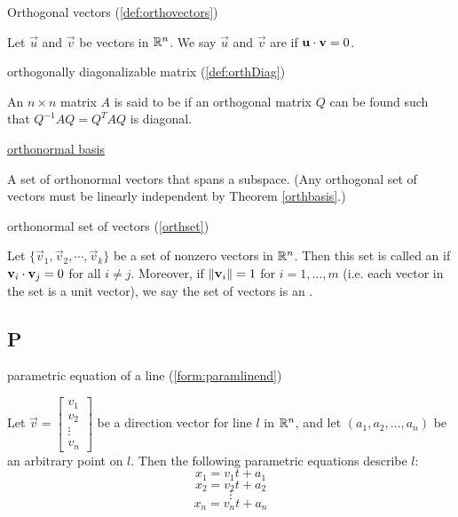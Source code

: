 \documentclass{ximera}
\begin{document}
Orthogonal vectors (\ref{def:orthovectors}) 
\begin{expandable}{}{}
Let $\vec{u}$ and $\vec{v}$ be vectors in $\mathbb{R}^n$. We say $\vec{u}$ and $\vec{v}$ are  if $\mathbf{u}\cdot \mathbf{v}=0$.
\end{expandable}


orthogonally diagonalizable matrix (\ref{def:orthDiag})
\begin{expandable}{}{}
    An $n \times n$ matrix $A$ is said to be  if an orthogonal matrix $Q$ can be found such that  $Q^{-1}AQ = Q^{T}AQ$ is diagonal.
\end{expandable}

\href{https://ximera.osu.edu/linearalgebradzv3/LinearAlgebraInteractiveIntro/RTH-0010/main}{orthonormal basis}
\begin{expandable}{}{}
    A set of orthonormal vectors that spans a subspace. (Any orthogonal set of vectors must be linearly independent by Theorem \ref{orthbasis}.)
\end{expandable}

orthonormal set of vectors (\ref{orthset})
\begin{expandable}{}{}
    Let $\{ \vec{v}_1, \vec{v}_2, \cdots, \vec{v}_k \}$ be a set of nonzero
vectors in $\mathbb{R}^n$. Then this set is called an
 if 
$\mathbf{v}_i \cdot \mathbf{v}_j = 0$ for all $i \neq j$.
Moreover, if $\left\lVert\mathbf{v}_i\right\rVert=1$ for $i=1,\ldots,m$ (i.e. each vector in the set is a unit vector), we say the set of vectors is an .
\end{expandable}



\subsection*{P}

parametric equation of a line (\ref{form:paramlinend})
\begin{expandable}{}{}
    Let $\vec{v}=\begin{bmatrix}v_1\\v_2\\\vdots\\v_n\end{bmatrix}$ be a direction vector for line $l$ in $\mathbb{R}^n$, and let $(a_1, a_2,\ldots , a_n)$ be an arbitrary point on $l$.  Then the following parametric equations describe $l$:
$$x_1=v_1t+a_1$$
%
$$x_2=v_2t+a_2$$
%
$$\vdots$$
%
$$x_n=v_nt+a_n$$
\end{expandable}
\end{document}
